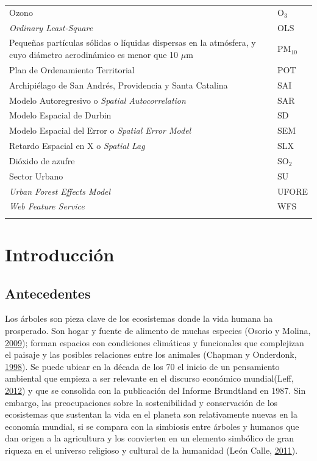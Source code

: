 \documentclass[12pt,a4paper,openany]{book}
\theoremstyle{definition}
\theoremstyle{definition}
\theoremstyle{definition}
\theoremstyle{remark}
\begin{document}
\begin{longtable}{>{\raggedright\arraybackslash}p{10cm}l}
Ozono & O$_3$\\
\addlinespace
\rowcolor{gray!6}  \textit{Ordinary Least-Square} & OLS\\
Pequeñas partículas sólidas o líquidas dispersas en la atmósfera, y cuyo diámetro aerodinámico es menor que 10 $\mu$m & PM$_{10}$\\
\rowcolor{gray!6}  Plan de Ordenamiento Territorial & POT\\
Archipiélago de San Andrés, Providencia y Santa Catalina & SAI\\
\rowcolor{gray!6}  Modelo Autoregresivo o \textit{Spatial Autocorrelation} & SAR\\
\addlinespace
Modelo Espacial de Durbin & SD\\
\rowcolor{gray!6}  Modelo Espacial del Error o \textit{Spatial Error Model} & SEM\\
Retardo Espacial en X o \textit{Spatial Lag} & SLX\\
\rowcolor{gray!6}  Dióxido de azufre & SO$_2$\\
Sector Urbano & SU\\
\addlinespace
\rowcolor{gray!6}  \textit{Urban Forest Effects Model} & UFORE\\
\textit{Web Feature Service} & WFS\\*
\end{longtable}

\listoffigures

\listoftables

\chapter{Introducción}\label{intro}

\section{Antecedentes}\label{antecedentes}

Los árboles son pieza clave de los ecosistemas donde la vida humana ha
prosperado. Son hogar y fuente de alimento de muchas especies (Osorio y
Molina, \protect\hyperlink{ref-osorio_vuelo_2009}{2009}); forman
espacios con condiciones climáticas y funcionales que complejizan el
paisaje y las posibles relaciones entre los animales (Chapman y
Onderdonk, \protect\hyperlink{ref-chapman_forests_1998}{1998}). Se puede
ubicar en la década de los 70 el inicio de un pensamiento ambiental que
empieza a ser relevante en el discurso económico mundial(Leff,
\protect\hyperlink{ref-leff_pensamiento_2012}{2012}) y que se consolida
con la publicación del Informe Brundtland en 1987. Sin embargo, las
preocupaciones sobre la sostenibilidad y conservación de los ecosistemas
que sustentan la vida en el planeta son relativamente nuevas en la
economía mundial, si se compara con la simbiosis entre árboles y humanos
que dan origen a la agricultura y los convierten en un elemento
simbólico de gran riqueza en el universo religioso y cultural de la
humanidad (León Calle,
\protect\hyperlink{ref-leon_calle_arboles_2011}{2011}).
\end{document}
